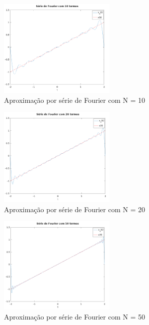 \documentclass{article}
\begin{document}
\begin{enumerate}[(a)]
 \begin{figure}[h!]
 \centering
 \includegraphics[width=0.5\textwidth]{images/plot_n10.png}
     \caption{Aproximação por série de Fourier com N = 10}
 \end{figure}

 \begin{figure}[h!]
 \centering
 \includegraphics[width=0.5\textwidth]{images/plot_n20.png}
     \caption{Aproximação por série de Fourier com N = 20}
 \end{figure}

 \begin{figure}[h!]
 \centering
 \includegraphics[width=0.5\textwidth]{images/plot_n50.png}
     \caption{Aproximação por série de Fourier com N = 50}
 \end{figure}

\break
\vspace*{\fill}
\break


\end{enumerate}
\end{document}
